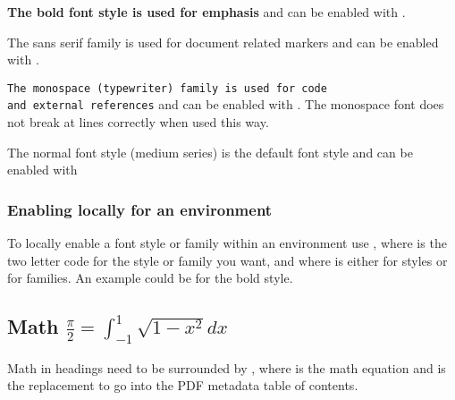 \textbf{The bold font style is used for emphasis}
and can be enabled with .

\textsf{The sans serif family is used for document related markers}
and can be enabled with .

\texttt{The monospace (typewriter) family is used for code}\\
\texttt{and external references}
and can be enabled with .
The monospace font does not break at lines correctly when used this way.

\textmd{The normal font style (medium series) is the default font style}
and can be enabled with 

\subsubsection{Enabling locally for an environment}
To locally enable a font style or family within an environment use ,
where  is the two letter code for the style or family you want,
and where  is either
 for styles
or  for  families.
An example could be  for the bold style.


\subsection{Math
    \texorpdfstring
        {$\frac{\pi}{2} = \int_{-1}^{1} \sqrt{1-x^2}dx$}
        {equation pi calculated by integral}
}
Math in headings need to be surrounded by ,
where  is the math equation
and  is the replacement to go into the PDF metadata table of contents.

